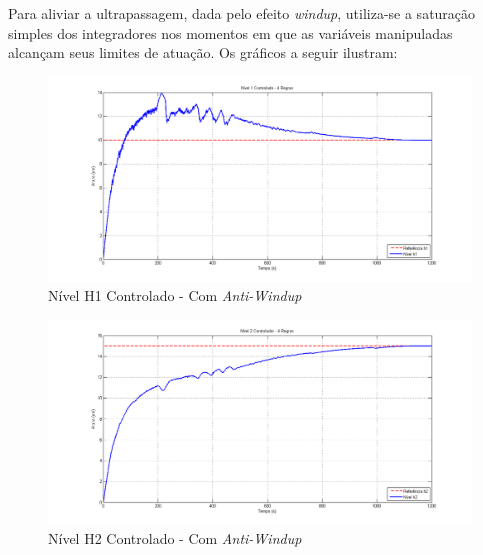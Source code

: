 Para aliviar a ultrapassagem, dada pelo efeito \textit{windup}, utiliza-se a saturação simples dos integradores nos momentos em que as variáveis manipuladas alcançam seus limites de atuação. Os gráficos a seguir ilustram:
\begin{figure}[H]
	\centering
	\includegraphics[width=\textwidth]{img/nm_ctrl_h1ts2.png}
	\caption{\small Nível H1 Controlado - Com \textit{Anti-Windup}}
	\label{figH1TSCtrl2_nm}
\end{figure}

\begin{figure}[H]
	\centering
	\includegraphics[width=\textwidth]{img/nm_ctrl_h2ts2.png}
	\caption{Nível H2 Controlado - Com \textit{Anti-Windup}}
	\label{figH2CtrlTS2_nm}
\end{figure}

%

